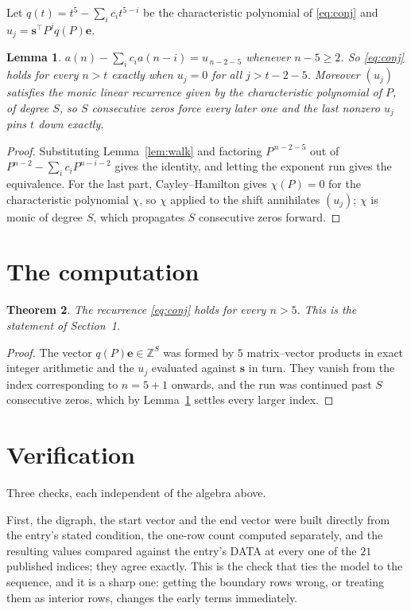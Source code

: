 \documentclass[11pt,a4paper]{article}
\theoremstyle{plain}
\newtheorem{theorem}{Theorem}
\newtheorem{lemma}[theorem]{Lemma}
\theoremstyle{definition}
\begin{document}
Let $q(t)=t^{5}-\sum_i c_i t^{5-i}$ be the characteristic polynomial of
\eqref{eq:conj} and $u_j=\mathbf{s}^{\!\top}P^{j}q(P)\mathbf{e}$.

\begin{lemma}\label{lem:crit}
$a(n)-\sum_i c_i a(n-i)=u_{\,n-2-5}$ whenever $n-5\ge2$. So \eqref{eq:conj}
holds for every $n>t$ exactly when $u_j=0$ for all $j>t-2-5$. Moreover $(u_j)$
satisfies the monic linear recurrence given by the characteristic polynomial of $P$, of
degree $S$, so $S$ consecutive zeros force every later one and the last nonzero $u_j$ pins
$t$ down exactly.
\end{lemma}

\begin{proof}
Substituting Lemma~\ref{lem:walk} and factoring $P^{\,n-2-5}$ out of
$P^{n-2}-\sum_i c_i P^{n-i-2}$ gives the identity, and letting the exponent run gives the
equivalence. For the last part, Cayley--Hamilton gives $\chi(P)=0$ for the characteristic
polynomial $\chi$, so $\chi$ applied to the shift annihilates $(u_j)$; $\chi$ is monic of
degree $S$, which propagates $S$ consecutive zeros forward.
\end{proof}

\section{The computation}

\begin{theorem}
The recurrence \eqref{eq:conj} holds for every $n>5$. This is the statement of
Section~1.
\end{theorem}

\begin{proof}
The vector $q(P)\mathbf{e}\in\mathbb{Z}^{S}$ was formed by $5$ matrix--vector
products in exact integer arithmetic and the $u_j$ evaluated against $\mathbf{s}$ in turn.
They vanish from the index corresponding to $n=5+1$ onwards, and the run was continued
past $S$ consecutive zeros, which by Lemma~\ref{lem:crit} settles every larger index.
\end{proof}

\section{Verification}

Three checks, each independent of the algebra above.

First, the digraph, the start vector and the end vector were built directly from the
entry's stated condition, the one-row count computed separately, and the resulting values
compared against the entry's DATA at every one of the $21$ published indices; they
agree exactly. This is the check that ties the model to the sequence, and it is a sharp one:
getting the boundary rows wrong, or treating them as interior rows, changes the early terms
immediately.
\end{document}
